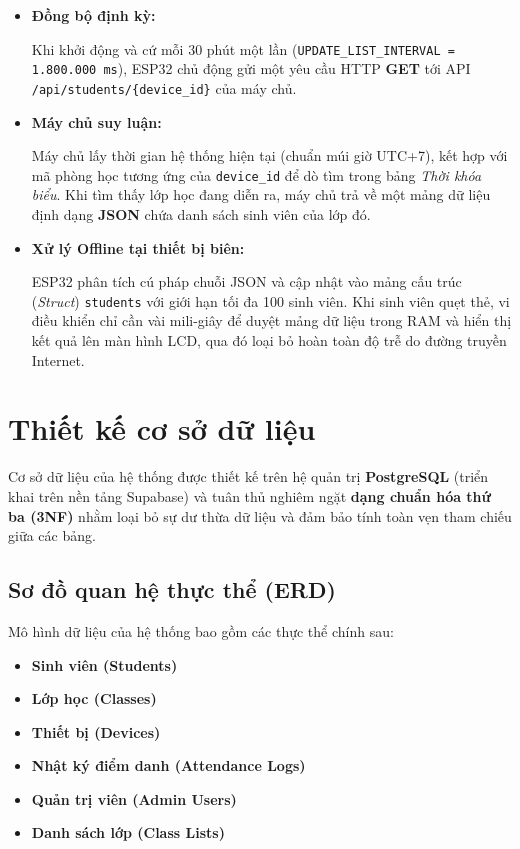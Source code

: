 \documentclass[12pt,a4paper]{report}
\begin{document}
\begin{itemize}

\item \textbf{Đồng bộ định kỳ:}

Khi khởi động và cứ mỗi 30 phút một lần (\texttt{UPDATE\_LIST\_INTERVAL = 1.800.000 ms}), ESP32 chủ động gửi một yêu cầu HTTP \textbf{GET} tới API \texttt{/api/students/\{device\_id\}} của máy chủ.

\item \textbf{Máy chủ suy luận:}

Máy chủ lấy thời gian hệ thống hiện tại (chuẩn múi giờ UTC+7), kết hợp với mã phòng học tương ứng của \texttt{device\_id} để dò tìm trong bảng \textit{Thời khóa biểu}. Khi tìm thấy lớp học đang diễn ra, máy chủ trả về một mảng dữ liệu định dạng \textbf{JSON} chứa danh sách sinh viên của lớp đó.

\item \textbf{Xử lý Offline tại thiết bị biên:}

ESP32 phân tích cú pháp chuỗi JSON và cập nhật vào mảng cấu trúc (\textit{Struct}) \texttt{students} với giới hạn tối đa 100 sinh viên. Khi sinh viên quẹt thẻ, vi điều khiển chỉ cần vài mili-giây để duyệt mảng dữ liệu trong RAM và hiển thị kết quả lên màn hình LCD, qua đó loại bỏ hoàn toàn độ trễ do đường truyền Internet.

\end{itemize}

\section{Thiết kế cơ sở dữ liệu}

Cơ sở dữ liệu của hệ thống được thiết kế trên hệ quản trị \textbf{PostgreSQL} (triển khai trên nền tảng Supabase) và tuân thủ nghiêm ngặt \textbf{dạng chuẩn hóa thứ ba (3NF)} nhằm loại bỏ sự dư thừa dữ liệu và đảm bảo tính toàn vẹn tham chiếu giữa các bảng.

\subsection{Sơ đồ quan hệ thực thể (ERD)}

Mô hình dữ liệu của hệ thống bao gồm các thực thể chính sau:

\begin{itemize}

\item \textbf{Sinh viên (Students)}

\item \textbf{Lớp học (Classes)}

\item \textbf{Thiết bị (Devices)}

\item \textbf{Nhật ký điểm danh (Attendance Logs)}

\item \textbf{Quản trị viên (Admin Users)}

\item \textbf{Danh sách lớp (Class Lists)}

\end{itemize}
\end{document}
